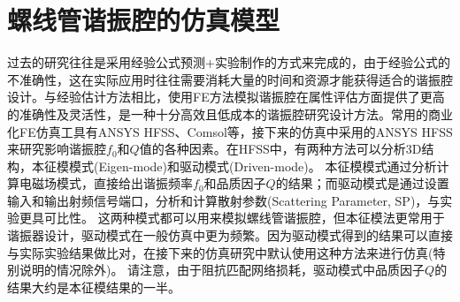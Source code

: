 


\section[螺线管谐振腔的仿真模型]{螺线管谐振腔的仿真模型}

过去的研究往往是采用经验公式预测+实验制作的方式来完成的，由于经验公式的不准确性，这在实际应用时往往需要消耗大量的时间和资源才能获得适合的谐振腔设计。与经验估计方法相比，使用FE方法模拟谐振腔在属性评估方面提供了更高的准确性及灵活性，是一种十分高效且低成本的谐振腔研究设计方法。常用的商业化FE仿真工具有ANSYS HFSS、Comsol等，接下来的仿真中采用的ANSYS HFSS来研究影响谐振腔$f_0$和$Q$值的各种因素。在HFSS中，有两种方法可以分析3D结构，本征模模式(Eigen-mode)和驱动模式(Driven-mode)。
本征模模式通过分析计算电磁场模式，直接给出谐振频率$f_0$和品质因子$Q$的结果；而驱动模式是通过设置输入和输出射频信号端口，分析和计算散射参数(Scattering Parameter, SP)，与实验更具可比性。
这两种模式都可以用来模拟螺线管谐振腔，但本征模法更常用于谐振器设计，驱动模式在一般仿真中更为频繁。因为驱动模式得到的结果可以直接与实际实验结果做比对，在接下来的仿真研究中默认使用这种方法来进行仿真(特别说明的情况除外)。
请注意，由于阻抗匹配网络损耗\cite[]{Gandolfi_Niedermayr_Kumph_Brownnutt_Blatt_2012}，驱动模式中品质因子$Q$的结果大约是本征模结果的一半。

